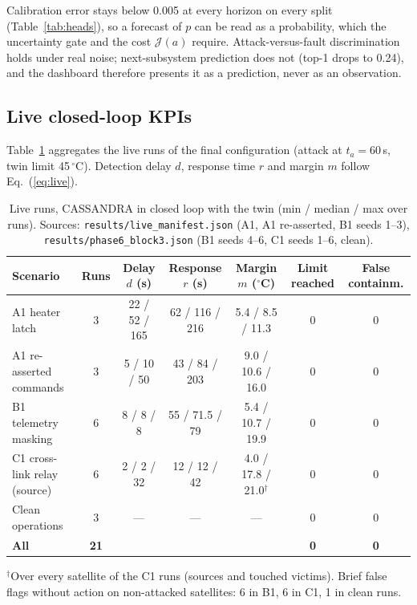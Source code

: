 \documentclass[10pt,a4paper]{article}
\newcommand{\file}[1]{\texttt{#1}}
\newcommand{\degC}{$^{\circ}$C}
\begin{document}
Calibration error stays below 0.005 at every horizon on every split (Table~\ref{tab:heads}), so a
forecast of $p$ can be read as a probability, which the uncertainty gate and the cost $\mathcal{J}(a)$
require. Attack-versus-fault discrimination holds under real noise; next-subsystem prediction does not
(top-1 drops to 0.24), and the dashboard therefore presents it as a prediction, never as an observation.

\subsection{Live closed-loop KPIs}
Table~\ref{tab:live} aggregates the live runs of the final configuration (attack at $t_a=60$\,s,
twin limit 45\,\degC). Detection delay $d$, response time $r$ and margin $m$ follow
Eq.~(\ref{eq:live}).

\begin{table}[ht]
\centering
\caption{Live runs, CASSANDRA in closed loop with the twin (min / median / max over runs). Sources:
\file{results/live\_manifest.json} (A1, A1 re-asserted, B1 seeds 1--3),
\file{results/phase6\_block3.json} (B1 seeds 4--6, C1 seeds 1--6, clean).}
\label{tab:live}
\small
\begin{tabular}{@{}lcccccc@{}}
\toprule
Scenario & Runs & Delay $d$ (s) & Response $r$ (s) & Margin $m$ (\degC) & Limit reached & False containm. \\
\midrule
A1 heater latch & 3 & 22 / 52 / 165 & 62 / 116 / 216 & 5.4 / 8.5 / 11.3 & 0 & 0 \\
A1 re-asserted commands & 3 & 5 / 10 / 50 & 43 / 84 / 203 & 9.0 / 10.6 / 16.0 & 0 & 0 \\
B1 telemetry masking & 6 & 8 / 8 / 8 & 55 / 71.5 / 79 & 5.4 / 10.7 / 19.9 & 0 & 0 \\
C1 cross-link relay (source) & 6 & 2 / 2 / 32 & 12 / 12 / 42 & 4.0 / 17.8 / 21.0$^{\dagger}$ & 0 & 0 \\
Clean operations & 3 & --- & --- & --- & 0 & 0 \\
\midrule
\textbf{All} & \textbf{21} & & & & \textbf{0} & \textbf{0} \\
\bottomrule
\end{tabular}

\smallskip
\footnotesize $^{\dagger}$Over every satellite of the C1 runs (sources and touched victims). Brief false
flags without action on non-attacked satellites: 6 in B1, 6 in C1, 1 in clean runs.
\end{table}
\end{document}
